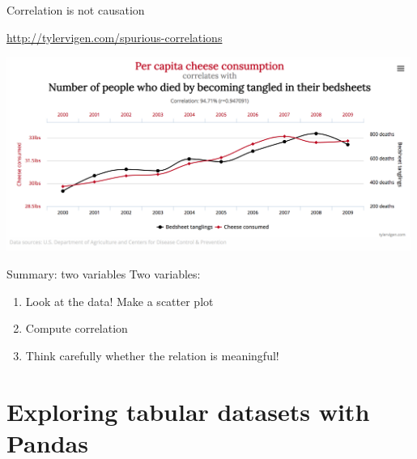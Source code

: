 \documentclass[aspectratio=169,usenames,dvipsnames]{beamer}
\begin{document}
\begin{frame}{Correlation is not causation}
\begin{reference}\vspace{1em}
    \url{http://tylervigen.com/spurious-correlations}
\end{reference}
\includegraphics[width=0.99\textwidth]{fig/cheese}
\end{frame}

\begin{frame}{Summary: two variables}
Two  variables:
\begin{enumerate}
    \item Look at the data! Make a scatter plot
    \item Compute correlation
    \item Think carefully whether the relation is meaningful!
\end{enumerate}
\end{frame}



\section{Exploring tabular datasets with Pandas}
\frame{\tableofcontents[currentsection]}


\end{document}
